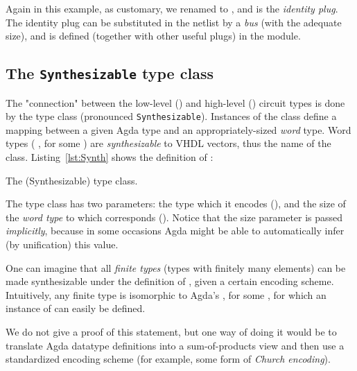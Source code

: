             Again in this example, as customary, we renamed  to ,
            and  is the \emph{identity plug}.
            The identity plug can be substituted in the netlist by a \emph{bus} (with the adequate size),
            and is defined (together with other useful plugs) in the  module.


        \subsection{The \texttt{Synthesizable} type class}
        \label{subsec:synthesizable}
            The "connection" between the low-level () and high-level () circuit types
            is done by the  type class (pronounced \texttt{Synthesizable}).
            Instances of the  class define a mapping between a given Agda type
            and an appropriately-sized \emph{word} type.
            Word types ( , for some ) are \emph{synthesizable} to \ac{VHDL} vectors,
            thus the name of the class.
            Listing~\ref{lst:Synth} shows the definition of :

            \begin{listing}[h]
                \newline
                \caption{The  (Synthesizable) type class.\label{lst:Synth}}
            \end{listing}

            The type class has two parameters: the type which it encodes (),
            and the size of the \emph{word type} to which  corresponds ().
            Notice that the size parameter is passed \emph{implicitly}, because in some occasions
            Agda might be able to automatically infer (by unification) this value.

            One can imagine that all \emph{finite types} (types with finitely many elements)
            can be made synthesizable under the definition of , given a certain encoding scheme.
            Intuitively, any finite type is isomorphic to Agda's  , for some ,
            for which an instance of  can easily be defined.

            We do not give a proof of this statement, but one way of doing it would be to translate
            Agda datatype definitions into a sum-of-products view and then use a standardized
            encoding scheme (for example, some form of \emph{Church encoding}).

